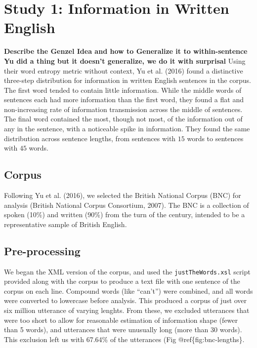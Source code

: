 \documentclass[10pt, letterpaper]{article}
\begin{document}
\hypertarget{study-1-information-in-written-english}{%
\section{Study 1: Information in Written
English}\label{study-1-information-in-written-english}}

\textbf{Describe the Genzel Idea and how to Generalize it to
within-sentence} \textbf{Yu did a thing but it doesn't generalize, we do
it with surprisal} Using their word entropy metric without context, Yu
et al. (2016) found a distinctive three-step distribution for
information in written English sentences in the corpus. The first word
tended to contain little information. While the middle words of
sentences each had more information than the first word, they found a
flat and non-increasing rate of information transmission across the
middle of sentences. The final word contained the most, though not most,
of the information out of any in the sentence, with a noticeable spike
in information. They found the same distribution across sentence
lengths, from sentences with \(15\) words to sentences with \(45\)
words.

\hypertarget{corpus}{%
\subsection{Corpus}\label{corpus}}

Following Yu et al. (2016), we selected the British National Corpus
(BNC) for analysis (British National Corpus Consortium, 2007). The BNC
is a collection of spoken (10\%) and written (90\%) from the turn of the
century, intended to be a representative sample of British English.

\hypertarget{pre-processing}{%
\subsection{Pre-processing}\label{pre-processing}}

We began the XML version of the corpus, and used the
\texttt{justTheWords.xsl} script provided along with the corpus to
produce a text file with one sentence of the corpus on each line.
Compound words (like ``can't'') were combined, and all words were
converted to lowercase before analysis. This produced a corpus of just
over six million utterance of varying lenghts. From these, we excluded
utterances that were too short to allow for reasonable estimation of
information shape (fewer than 5 words), and utterances that were
unusually long (more than 30 words). This exclusion left us with 67.64\%
of the utterances (Fig @ref\{fig:bnc-lengths\}.
\end{document}
